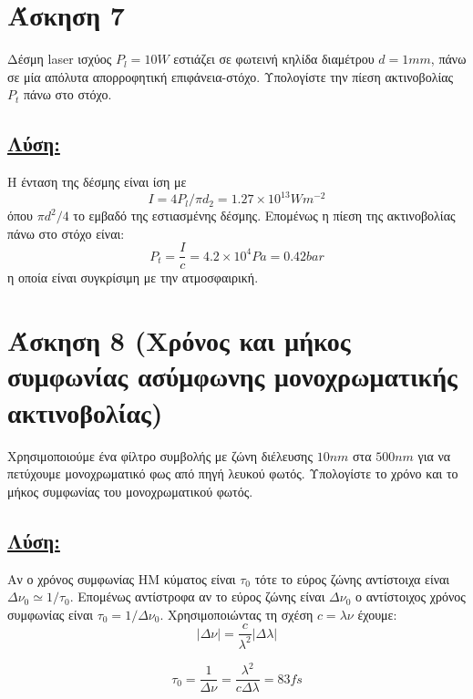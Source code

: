 \documentclass[a4paper,11pt,titlepage]{article}
\begin{document}
\section{Άσκηση 7}

Δέσμη laser ισχύος $P_l=10W$ εστιάζει σε φωτεινή κηλίδα διαμέτρου $d=1mm$, πάνω σε μία απόλυτα απορροφητική επιφάνεια-στόχο. Υπολογίστε την πίεση ακτινοβολίας $P_t$ πάνω στο στόχο.

\subsection*{\underline{Λύση:}}

Η ένταση της δέσμης είναι ίση με 
\begin{equation}
I=4P_l/{\pi}d_2=1.27\times10^{13} Wm^{-2}
\end{equation}
όπου ${\pi}d^2/4$ το εμβαδό της εστιασμένης δέσμης. Επομένως η πίεση της ακτινοβολίας πάνω στο στόχο είναι:
\begin{equation}
 P_t=\frac{I}{c}=4.2\times10^4Pa=0.42 bar
\end{equation}
η οποία είναι συγκρίσιμη με την ατμοσφαιρική.
\newpage
\section{Άσκηση 8 (Χρόνος και μήκος συμφωνίας ασύμφωνης μονοχρωματικής ακτινοβολίας)}
Χρησιμοποιούμε ένα φίλτρο συμβολής με ζώνη διέλευσης $10nm$ στα $500nm$ για να πετύχουμε μονοχρωματικό φως από πηγή λευκού φωτός. Υπολογίστε το χρόνο και το μήκος συμφωνίας του μονοχρωματικού φωτός.

\subsection*{\underline{Λύση:}}

Αν ο χρόνος συμφωνίας ΗΜ κύματος είναι $\tau_0$ τότε το εύρος ζώνης αντίστοιχα είναι $\Delta\nu_0\simeq 1/\tau_0$. Επομένως αντίστροφα αν το εύρος ζώνης είναι $\Delta\nu_0$ ο αντίστοιχος χρόνος συμφωνίας είναι $\tau_0=1/\Delta\nu_0$. Χρησιμοποιώντας τη σχέση $c=\lambda\nu$ έχουμε:
\begin{equation}
 |\Delta\nu|=\frac{c}{\lambda^2}|\Delta\lambda|
\end{equation}

\begin{equation}
 \tau_0=\frac{1}{\Delta\nu}=\frac{\lambda^2}{c\Delta\lambda}=83fs
\end{equation}
\end{document}
